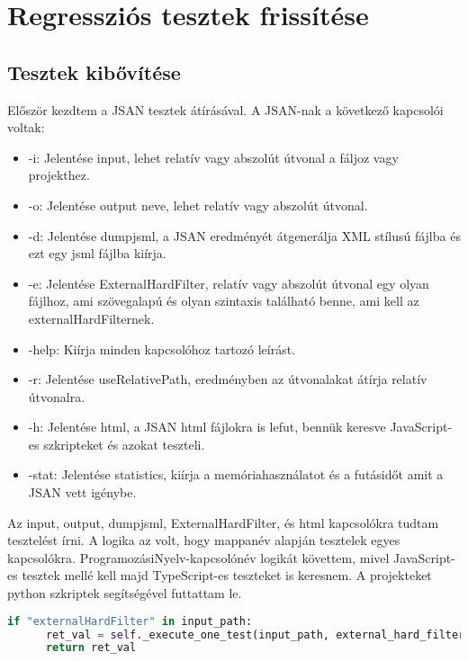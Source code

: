 \chapter{Regressziós tesztek frissítése}\label{chap:Regteszt_frissítés}

\section{Tesztek kibővítése}
Először kezdtem a JSAN tesztek átírásával. A JSAN-nak a következő kapcsolói voltak:
\begin{itemize}
      \item -i: Jelentése input, lehet relatív vagy abszolút útvonal a fáljoz vagy projekthez.
      \item -o: Jelentése output neve, lehet relatív vagy abszolút útvonal.
      \item -d: Jelentése dumpjsml, a JSAN eredményét átgenerálja XML stílusú fájlba és ezt egy jsml fájlba kiírja.
      \item -e: Jelentése ExternalHardFilter, relatív vagy abszolút útvonal egy olyan fájlhoz, ami szövegalapú és olyan szintaxis található benne, ami kell az externalHardFilternek.
      \item -help: Kiírja minden kapcsolóhoz tartozó leírást.
      \item -r: Jelentése useRelativePath, eredményben az útvonalakat átírja relatív útvonalra.
      \item -h: Jelentése html, a JSAN html fájlokra is lefut, bennük keresve JavaScript-es szkripteket és azokat teszteli.
      \item -stat: Jelentése statistics, kiírja a memóriahasználatot és a futásidőt amit a JSAN vett igénybe.
\end{itemize}


Az input, output, dumpjsml, ExternalHardFilter, és html kapcsolókra tudtam tesztelést írni. A logika az volt, hogy mappanév alapján tesztelek egyes kapcsolókra.
ProgramozásiNyelv-kapcsolónév logikát követtem, mivel JavaScript-es tesztek mellé kell majd TypeScript-es teszteket is keresnem.
A projekteket python szkriptek segítségével futtattam le.

\begin{lstlisting}[caption={JSAN kapcsoló vizsgálat pythonban}, label={lst:python_kapcsolo}, language={Python}]
if "externalHardFilter" in input_path:
      ret_val = self._execute_one_test(input_path, external_hard_filter=True) and ret_val
      return ret_val
\end{lstlisting}

